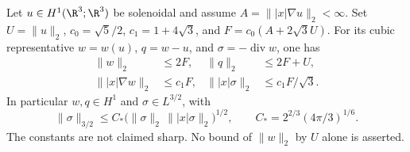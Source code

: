 \begin{theorem}
\label{cm:snapshot}
Let $u\in H^1(\R^3;\R^3)$ be solenoidal and assume
$A=\||x|\nabla u\|_2<\infty$. Set $U=\|u\|_2$,
$c_0=\sqrt5/2$, $c_1=1+4\sqrt3$, and
$F=c_0(A+2\sqrt3 U)$. For its cubic representative $w=w(u)$,
$q=w-u$, and $\sigma=-\operatorname{div}w$, one has
\begin{align}
 \|w\|_2&\le2F,& \|q\|_2&\le2F+U,\label{cm:l2}\\
 \||x|\nabla w\|_2&\le c_1F,&
 \||x|\sigma\|_2&\le c_1F/\sqrt3.\label{cm:weighted}
\end{align}
In particular $w,q\in H^1$ and $\sigma\in L^{3/2}$, with
\begin{equation}\label{cm:sigma-threehalves}
 \|\sigma\|_{3/2}
 \le C_*\bigl(\|\sigma\|_2\,\||x|\sigma\|_2\bigr)^{1/2},
 \qquad C_*=2^{2/3}(4\pi/3)^{1/6}.
\end{equation}
The constants are not claimed sharp. No bound of $\|w\|_2$ by $U$
alone is asserted.
\end{theorem}
